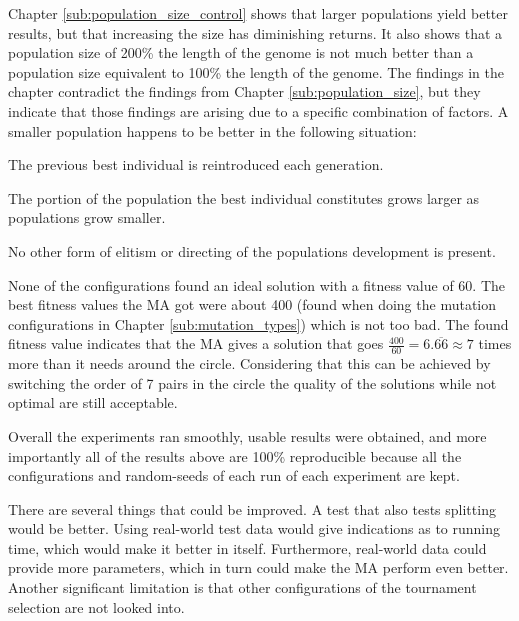 Chapter \ref{sub:population_size_control} shows that larger populations yield better results, but that increasing the size has diminishing returns. It also shows that a population size of 200\% the length of the genome is not much better than a population size equivalent to 100\% the length of the genome. The findings in the chapter contradict the findings from Chapter \ref{sub:population_size}, but they indicate that those findings are arising due to a specific combination of factors. A smaller population happens to be better in the following situation:

\begin{compactitem}
    \item The previous best individual is reintroduced each generation.
    \item The portion of the population the best individual constitutes grows larger as populations grow smaller.
    \item No other form of elitism or directing of the populations development is present.
\end{compactitem}

None of the configurations found an ideal solution with a fitness value of 60. The best fitness values the MA got were about 400 (found when doing the mutation configurations in Chapter \ref{sub:mutation_types}) which is not too bad. The found fitness value indicates that the MA gives a solution that goes $\frac{400}{60} = 6.\overline{66} \approx 7$ times more than it needs around the circle. Considering that this can be achieved by switching the order of 7 pairs in the circle the quality of the solutions while not optimal are still acceptable.

Overall the experiments ran smoothly, usable results were obtained, and more importantly all of the results above are 100\% reproducible because all the configurations and random-seeds of each run of each experiment are kept.

There are several things that could be improved. A test that also tests splitting would be better. Using real-world test data would give indications as to running time, which would make it better in itself. Furthermore, real-world data could provide more parameters, which in turn could make the MA perform even better. Another significant limitation is that other configurations of the tournament selection are not looked into.

